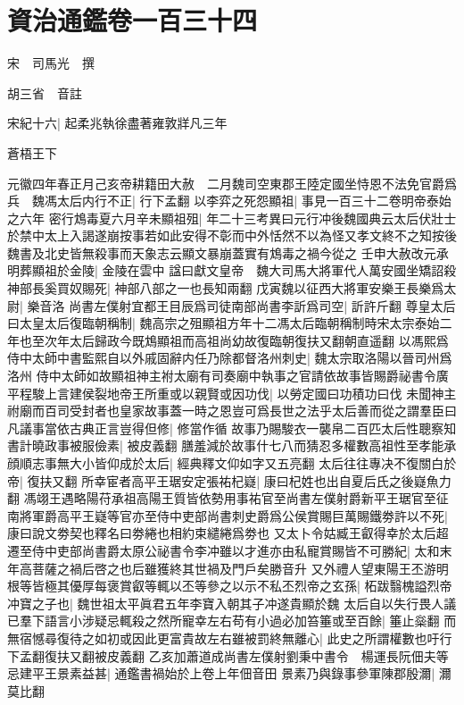 \section{資治通鑑卷一百三十四}
宋　司馬光　撰

胡三省　音註

宋紀十六|{
	起柔兆執徐盡著雍敦牂凡三年}


蒼梧王下

元徽四年春正月己亥帝耕籍田大赦　二月魏司空東郡王陸定國坐恃恩不法免官爵爲兵　魏馮太后内行不正|{
	行下孟翻}
以李弈之死怨顯祖|{
	事見一百三十二卷明帝泰始之六年}
密行鴆毒夏六月辛未顯祖殂|{
	年二十三考異曰元行冲後魏國典云太后伏壯士於禁中太上入謁遂崩按事若如此安得不彰而中外恬然不以為怪又孝文終不之知按後魏書及北史皆無殺事而天象志云顯文暴崩蓋實有鴆毒之禍今從之}
壬申大赦改元承明葬顯祖於金陵|{
	金陵在雲中}
諡曰獻文皇帝　魏大司馬大將軍代人萬安國坐矯詔殺神部長奚買奴賜死|{
	神部八部之一也長知兩翻}
戊寅魏以征西大將軍安樂王長樂爲太尉|{
	樂音洛}
尚書左僕射宜都王目辰爲司徒南部尚書李訢爲司空|{
	訢許斤翻}
尊皇太后曰太皇太后復臨朝稱制|{
	魏高宗之殂顯祖方年十二馮太后臨朝稱制時宋太宗泰始二年也至次年太后歸政今既鴆顯祖而高祖尚幼故復臨朝復扶又翻朝直遥翻}
以馮熙爲侍中太師中書監熙自以外戚固辭内任乃除都督洛州刺史|{
	魏太宗取洛陽以晉司州爲洛州}
侍中太師如故顯祖神主袝太廟有司奏廟中執事之官請依故事皆賜爵祕書令廣平程駿上言建侯裂地帝王所重或以親賢或因功伐|{
	以勞定國曰功積功曰伐}
未聞神主祔廟而百司受封者也皇家故事蓋一時之恩豈可爲長世之法乎太后善而從之謂羣臣曰凡議事當依古典正言豈得但修|{
	修當作循}
故事乃賜駿衣一襲帛二百匹太后性聰察知書計曉政事被服儉素|{
	被皮義翻}
膳羞減於故事什七八而猜忍多權數高祖性至孝能承顔順志事無大小皆仰成於太后|{
	經典釋文仰如字又五亮翻}
太后往往專决不復關白於帝|{
	復扶又翻}
所幸宦者高平王琚安定張祐杞嶷|{
	康曰杞姓也出自夏后氏之後嶷魚力翻}
馮翊王遇略陽苻承祖高陽王質皆依勢用事祐官至尚書左僕射爵新平王琚官至征南將軍爵高平王嶷等官亦至侍中吏部尚書刺史爵爲公侯賞賜巨萬賜鐵劵許以不死|{
	康曰說文劵契也釋名曰劵綣也相約束繾綣爲劵也}
又太卜令姑臧王叡得幸於太后超遷至侍中吏部尚書爵太原公祕書令李冲雖以才進亦由私寵賞賜皆不可勝紀|{
	太和末年高菩薩之禍后啓之也后雖獲終其世禍及門戶矣勝音升}
又外禮人望東陽王丕游明根等皆極其優厚每褒賞叡等輒以丕等參之以示不私丕烈帝之玄孫|{
	柘跋翳槐謚烈帝}
冲寶之子也|{
	魏世祖太平眞君五年李寶入朝其子冲遂貴顯於魏}
太后自以失行畏人議已羣下語言小涉疑忌輒殺之然所寵幸左右苟有小過必加笞箠或至百餘|{
	箠止橤翻}
而無宿憾尋復待之如初或因此更富貴故左右雖被罰終無離心|{
	此史之所謂權數也吁行下孟翻復扶又翻被皮義翻}
乙亥加蕭道成尚書左僕射劉秉中書令　楊運長阮佃夫等忌建平王景素益甚|{
	通鑑書禍始於上卷上年佃音田}
景素乃與錄事參軍陳郡殷濔|{
	濔莫比翻}
